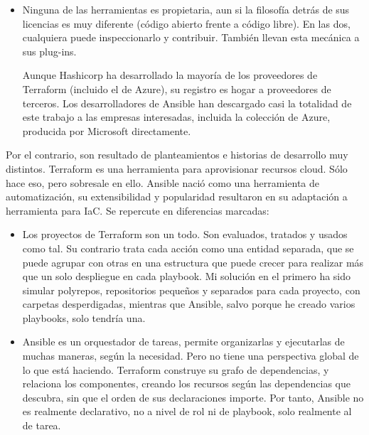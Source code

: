 \documentclass[11pt]{article}
\begin{document}
\begin{flushleft}
\begin{itemize}
            \item Ninguna de las herramientas es propietaria, aun si la filosofía detrás de sus licencias es muy diferente (código abierto frente a código libre). En las dos, cualquiera puede inspeccionarlo y contribuir. También llevan esta mecánica a sus plug-ins. 
            \linebreak
            
            Aunque Hashicorp ha desarrollado la mayoría de los proveedores de Terraform (incluido el de Azure), su registro es hogar a proveedores de terceros. Los desarrolladores de Ansible han descargado casi la totalidad de este trabajo a las empresas interesadas, incluida la colección de Azure, producida por Microsoft directamente.
            \linebreak
		\end{itemize}

Por el contrario, son resultado de planteamientos e historias de desarrollo muy distintos. Terraform es una herramienta para aprovisionar recursos cloud. Sólo hace eso, pero sobresale en ello. Ansible nació como una herramienta de automatización, su extensibilidad y popularidad resultaron en su adaptación a herramienta para IaC. Se repercute en diferencias marcadas:
\skip
        \begin{itemize}
			\itemsep0em 
			\item Los proyectos de Terraform son un todo. Son evaluados, tratados y usados como tal. Su contrario trata cada acción como una entidad separada, que se puede agrupar con otras en una estructura que puede crecer para realizar más que un solo despliegue en cada playbook. Mi solución en el primero ha sido simular polyrepos, repositorios pequeños y separados para cada proyecto, con carpetas desperdigadas, mientras que Ansible, salvo porque he creado varios playbooks, solo tendría una.
            \linebreak
            
            \item Ansible es un orquestador de tareas, permite organizarlas y ejecutarlas de muchas maneras, según la necesidad. Pero no tiene una perspectiva global de lo que está haciendo. Terraform construye su grafo de dependencias, y relaciona los componentes, creando los recursos según las dependencias que descubra, sin que el orden de sus declaraciones importe. Por tanto, Ansible no es realmente declarativo, no a nivel de rol ni de playbook, solo realmente al de tarea.
            \linebreak
            

\end{itemize}
\end{flushleft}
\end{document}
